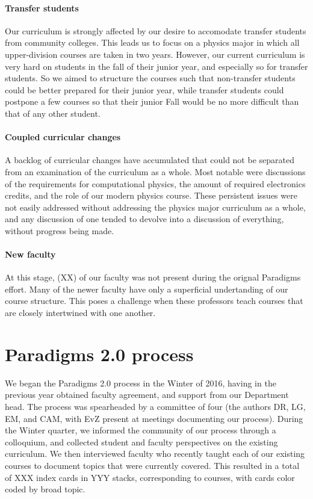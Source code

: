 \documentclass[english,aps,pra,reprint,noshowpacs,superscriptaddress]{revtex4-1}
\begin{document}
\paragraph{Transfer students}
Our curriculum is strongly affected by our desire to accomodate
transfer students from community colleges.  This leads us to focus on
a physics major in which all upper-division courses are taken in two
years.  However, our current curriculum is very hard on students in
the fall of their junior year, and especially so for transfer
students.  So we aimed to structure the courses such that non-transfer
students could be better prepared for their junior year, while
transfer students could postpone a few courses so that their junior
Fall would be no more difficult than that of any other student.

\paragraph{Coupled curricular changes}
A backlog of curricular changes have accumulated that could not be
separated from an examination of the curriculum as a whole.  Most
notable were discussions of the requirements for computational
physics, the amount of required electronics credits, and the role of
our modern physics course.  These persistent issues were not easily
addressed without addressing the physics major curriculum as a whole,
and any discussion of one tended to devolve into a discussion of
everything, without progress being made.

\paragraph{New faculty}
At this stage, (XX) of our faculty was not present during the orignal
Paradigms effort.  Many of the newer faculty have only a superficial
undertanding of our course structure.  This poses a challenge when
these professors teach courses that are closely intertwined with one
another.

\section{Paradigms 2.0 process}
We began the Paradigms 2.0 process in the Winter of 2016, having in
the previous year obtained faculty agreement, and support from our
Department head.  The process was spearheaded by a committee of four
(the authors DR, LG, EM, and CAM, with EvZ present at meetings
documenting our process).  During the Winter quarter, we informed the
community of our process through a colloquium, and collected student
and faculty perspectives on the existing curriculum.  We then
interviewed faculty who recently taught each of our existing courses
to document topics that were currently covered.  This resulted in a
total of XXX index cards in YYY stacks, corresponding to courses, with
cards color coded by broad topic.
\end{document}
